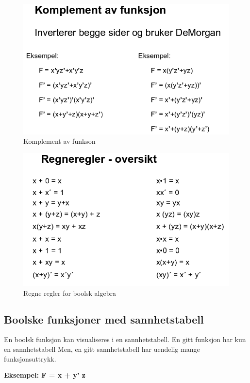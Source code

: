 \documentclass{article}
\begin{document}
	\begin{figure}[H]
		\includegraphics[scale=0.55]{Komplement.png}
		\caption{Komplement av funkson}
	\end{figure}
	
	\begin{figure}[H]
		\includegraphics[scale=0.6]{Regneregler.png}
		\caption{Regne regler for boolsk algebra}
	\end{figure}
	
	\subsection*{Boolske funksjoner med sannhetstabell}
	En boolsk funksjon kan visualiseres i en 
	sannhetstabell.
	En gitt	funksjon har kun en	sannhetstabell 
	Men, en gitt sannhetstabell har uendelig mange funksjonsuttrykk.
	
	\textbf{Eksempel: F = x + y' z}
	
\end{document}
